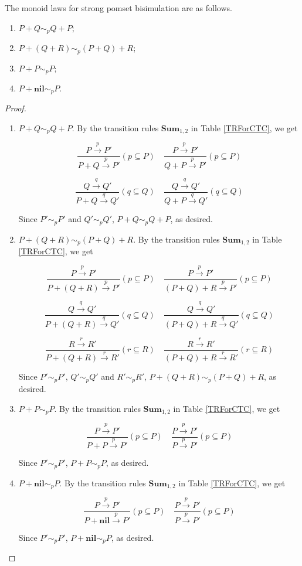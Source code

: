 \begin{proposition} The monoid laws for strong pomset bisimulation are as follows.

\begin{enumerate}
  \item $P+Q\sim_p Q+P$;
  \item $P+(Q+R)\sim_p (P+Q)+R$;
  \item $P+P\sim_p P$;
  \item $P+\textbf{nil}\sim_p P$.
\end{enumerate}

\end{proposition}

\begin{proof}
\begin{enumerate}
  \item $P+Q\sim_p Q+P$. By the transition rules $\textbf{Sum}_{1,2}$ in Table \ref{TRForCTC}, we get

      $$\frac{P\xrightarrow{p}P'}{P+ Q\xrightarrow{p}P'} (p\subseteq P) \quad \frac{P\xrightarrow{p}P'}{Q+ P\xrightarrow{p}P'}(p\subseteq P)$$

      $$\frac{Q\xrightarrow{q}Q'}{P+ Q\xrightarrow{q}Q'}(q\subseteq Q) \quad \frac{Q\xrightarrow{q}Q'}{Q+ P\xrightarrow{q}Q'}(q\subseteq Q)$$

      Since $P'\sim_p P'$ and $Q'\sim_p Q'$, $P+ Q\sim_p Q+ P$, as desired.
  \item $P+(Q+R)\sim_p (P+Q)+R$. By the transition rules $\textbf{Sum}_{1,2}$ in Table \ref{TRForCTC}, we get

      $$\frac{P\xrightarrow{p}P'}{P+(Q+R)\xrightarrow{p}P'}(p\subseteq P) \quad \frac{P\xrightarrow{p}P'}{(P+Q)+R\xrightarrow{p}P'}(p\subseteq P)$$

      $$\frac{Q\xrightarrow{q}Q'}{P+(Q+R)\xrightarrow{q}Q'}(q\subseteq Q) \quad \frac{Q\xrightarrow{q}Q'}{(P+Q)+R\xrightarrow{q}Q'}(q\subseteq Q)$$

      $$\frac{R\xrightarrow{r}R'}{P+(Q+R)\xrightarrow{r}R'}(r\subseteq R) \quad \frac{R\xrightarrow{r}R'}{(P+Q)+R\xrightarrow{r}R'}(r\subseteq R)$$

      Since $P'\sim_p P'$, $Q'\sim_p Q'$ and $R'\sim_p R'$, $P+(Q+R)\sim_p (P+Q)+R$, as desired.
  \item $P+P\sim_p P$. By the transition rules $\textbf{Sum}_{1,2}$ in Table \ref{TRForCTC}, we get

      $$\frac{P\xrightarrow{p}P'}{P+ P\xrightarrow{p}P'}(p\subseteq P) \quad \frac{P\xrightarrow{p}P'}{P\xrightarrow{p}P'}(p\subseteq P)$$

      Since $P'\sim_p P'$, $P+ P\sim_p P$, as desired.
  \item $P+\textbf{nil}\sim_p P$. By the transition rules $\textbf{Sum}_{1,2}$ in Table \ref{TRForCTC}, we get

      $$\frac{P\xrightarrow{p}P'}{P+ \textbf{nil}\xrightarrow{p}P'}(p\subseteq P) \quad \frac{P\xrightarrow{p}P'}{P\xrightarrow{p}P'}(p\subseteq P)$$

      Since $P'\sim_p P'$, $P+ \textbf{nil}\sim_p P$, as desired.
\end{enumerate}
\end{proof}

